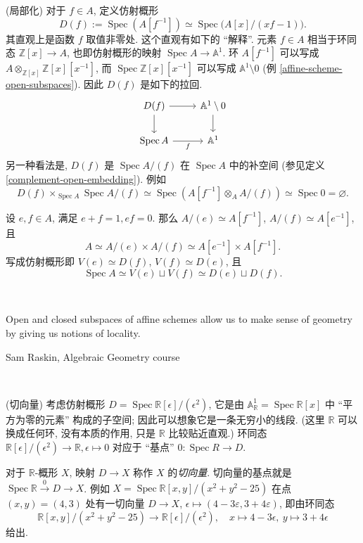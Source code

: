 \documentclass{book}
\newcommand{\philoquote}[2]{
	~\\
	\begin{center}
		\begin{minipage}{0.7\linewidth}
			{\quad\sffamily #1}\\
			\begin{flushright}
				\textsf{#2}
			\end{flushright}
		\end{minipage}
	\end{center}
	~\\
}
\begin{document}
	\begin{example}
		[label={standard-open-affine-localization}]
		{(局部化)}
		对于 $f\in A$, 定义仿射概形
		$$
		D(f) := \operatorname{Spec} (A[f^{-1}]) \simeq \operatorname{Spec}\big(A[x]/(xf-1)\big).
		$$
		其直观上是函数 $f$ 取值非零处. 这个直观有如下的 ``解释''. 元素 $f\in A$ 相当于环同态 $\mathbb{Z}[x]\to A$, 也即仿射概形的映射 $\operatorname{Spec} A\to\mathbb A^1$. 环 $A[f^{-1}]$ 可以写成 $A\otimes_{\mathbb{Z}[x]}\mathbb{Z}[x][x^{-1}]$, 而 $\operatorname{Spec} \mathbb {Z}[x][x^{-1}]$ 可以写成 $\mathbb{A}^1\setminus 0$ (例 \ref{affine-scheme-open-subspaces}). 因此 $D(f)$ 是如下的拉回.
		\[\begin{tikzcd}[ampersand replacement=\&]
			{D(f)} \& {\mathbb{A}^1\setminus 0} \\
			{\operatorname{Spec} A} \& {\mathbb{A}^1}
			\arrow[from=1-1, to=1-2]
			\arrow[from=1-1, to=2-1]
			\arrow[from=1-2, to=2-2]
			\arrow["f"', from=2-1, to=2-2]
		\end{tikzcd}\]
		另一种看法是, $D(f)$ 是 $\operatorname{Spec} A/(f)$ 在 $\operatorname{Spec} A$ 中的补空间 (参见定义 \ref{complement-open-embedding}).
		例如
		$$
		D(f)\times_{\operatorname{Spec} A}\operatorname{Spec} A/(f) \simeq \operatorname{Spec} (A[f^{-1}]\otimes_A A/(f))\simeq\operatorname{Spec} 0 = \varnothing.
		$$
	\end{example}
	
	\begin{example}
		[label={idempotent-spec-decomposition}]
		{}
		设 $e,f\in A$, 满足 $e+f=1,ef=0$. 那么
		$A/(e)\simeq A[f^{-1}]$, $A/(f)\simeq A[e^{-1}]$,
		且 $$A\simeq A/(e) \times A/(f)\simeq A[e^{-1}]\times A[f^{-1}].$$
		写成仿射概形即 $V(e)\simeq D(f)$, $V(f)\simeq D(e)$, 且 $$\operatorname{Spec} A \simeq V(e)\sqcup V(f)\simeq D(e)\sqcup D(f).$$
	\end{example}
	
	\philoquote{Open and closed subspaces of affine schemes allow us to make sense of geometry by giving us notions of locality.}{Sam Raskin, Algebraic Geometry course}
	
	\begin{example}
		{(切向量)}
		考虑仿射概形 $D=\operatorname{Spec} \mathbb{R}[\epsilon]/(\epsilon^2)$, 它是由 $\mathbb{A}^1_{\mathbb{R}}=\operatorname{Spec}\mathbb{R}[x]$ 中 ``平方为零的元素'' 构成的子空间; 因此可以想象它是一条无穷小的线段. (这里 $\mathbb{R}$ 可以换成任何环, 没有本质的作用, 只是 $\mathbb{R}$ 比较贴近直观.)
		环同态 $\mathbb R[\epsilon]/(\epsilon^2)\to\mathbb{R},\epsilon\mapsto 0$ 对应于 ``基点'' $0\colon \operatorname{Spec} R\to D$.
		
		对于 $\mathbb{R}$-概形 $X$,
		映射 $D\to X$ 称作 $X$ 的\emph{切向量}. 切向量的基点就是 $\operatorname{Spec} \mathbb{R}\overset{0}{\to}D\to X$.
		例如 $X=\operatorname{Spec} \mathbb{R}[x,y]/(x^2+y^2-25)$ 在点 $(x,y)=(4,3)$ 处有一切向量 $D\to X$, $\epsilon\mapsto (4-3\varepsilon,3+4\varepsilon)$, 即由环同态
		$$
		\mathbb{R}[x,y]/(x^2+y^2-25) \to \mathbb{R}[\epsilon]/(\epsilon^2),
		\quad
		x\mapsto 4-3\epsilon,\ y\mapsto 3+4\epsilon
		$$
		给出.
	\end{example}
	
\end{document}
